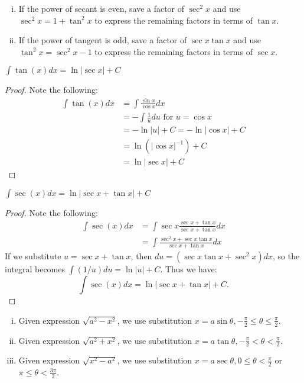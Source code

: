 \documentclass[a4paper,8pt]{article}
\begin{document}
\begin{outline}
    \begin{enumerate}[i.]
      \item
        If the power of secant is even, save a factor of \(\sec^2x\) and use \(\sec^2x=1+\tan^2x\) to express the
        remaining factors in terms of \(\tan{x}\).
      \item
        If the power of tangent is odd, save a factor of \(\sec{x}\tan{x}\) and use \(\tan^2x=\sec^2x-1\) to express
        the remaining factors in terms of \(\sec{x}\).
    \end{enumerate}

    \(\int\tan{(x)}dx = \ln{|\sec{x}|} + C\)

    \begin{proof}
      Note the following:
      \begin{align*}
        \int\tan{(x)}dx &= \int\frac{\sin{x}}{\cos{x}}dx \\
                        &= -\int\frac{1}{u}du \text{ for } u=\cos{x}\\
                        &= -\ln{|u|} + C = -\ln{|\cos{x}|} + C \\
                        &= \ln{(|\cos{x}|^{-1})} + C \\
                        &= \ln{|\sec{x}|} + C
      \end{align*}
    \end{proof}

    \(\int\sec{(x)}dx = \ln{|\sec{x}+\tan{x}|} + C\)

    \begin{proof}
      Note the following:
      \begin{align*}
        \int\sec{(x)}dx &= \int\sec{x}\frac{\sec{x}+\tan{x}}{\sec{x}+\tan{x}}dx \\
                        &= \int\frac{\sec^2x+\sec{x}\tan{x}}{\sec{x}+\tan{x}}dx
      \end{align*}
      If we substitute \(u=\sec{x}+\tan{x}\), then \(du=(\sec{x}\tan{x}+\sec^2{x})dx\), so the integral
      becomes \(\int(1/u)du = \ln{|u|} + C\). Thus we have: \[ \int\sec{(x)}dx = \ln{|\sec{x}+\tan{x}|} +
      C\text{.} \]
    \end{proof}

    \begin{enumerate}[i.]
      \item
        Given expression \(\sqrt{a^2-x^2}\), we use substitution \(x=a\sin{\theta}, -\frac{\pi}{2}
        \leq\theta\leq\frac{\pi}{2}\).
      \item
        Given expression \(\sqrt{a^2+x^2}\), we use substitution \(x=a\tan{\theta}, -\frac{\pi}{2}
        < \theta < \frac{\pi}{2}\).
      \item
        Given expression \(\sqrt{x^2-a^2}\), we use substitution \(x=a\sec{\theta}, 0\leq\theta<\frac{\pi}{2}\)
        or \(\pi\leq\theta<\frac{3\pi}{2}\).
    \end{enumerate}


\end{outline}
\end{document}
